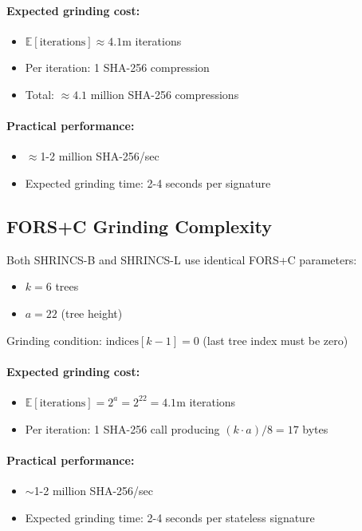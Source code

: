 \paragraph{Expected grinding cost:}
\begin{itemize}
    \item $\mathbb{E}[\text{iterations}] \approx 4.1$m iterations
    \item Per iteration: 1 SHA-256 compression
    \item Total: $\approx 4.1$ million SHA-256 compressions
\end{itemize}

\paragraph{Practical performance:}
\begin{itemize}
    \item  $\approx$1-2 million SHA-256/sec
    \item Expected grinding time: 2-4 seconds per signature
\end{itemize}

\subsection{FORS+C Grinding Complexity}
Both SHRINCS-B and SHRINCS-L use identical FORS+C parameters:
\begin{itemize}
    \item $k = 6$ trees
    \item $a = 22$ (tree height)
\end{itemize}

Grinding condition: $\text{indices}[k-1] = 0$ (last tree index must be zero)

\paragraph{Expected grinding cost:}
\begin{itemize}
    \item $\mathbb{E}[\text{iterations}] = 2^a = 2^{22} = 4.1$m iterations
    \item Per iteration: 1 SHA-256 call producing $(k \cdot a)/8 = 17$ bytes
\end{itemize}

\paragraph{Practical performance:}
\begin{itemize}
    \item $\sim$1-2 million SHA-256/sec
    \item Expected grinding time: 2-4 seconds per stateless signature
\end{itemize}